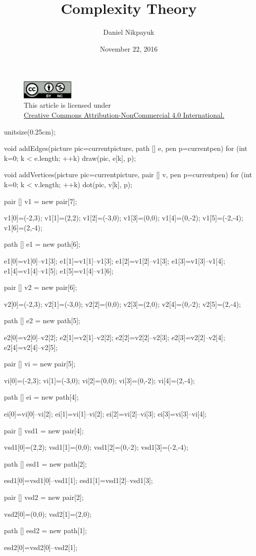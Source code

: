 \documentclass[twoside]{article}
\title{Complexity Theory}
\author{Daniel Nikpayuk}
\date{November 22, 2016}
\begin{document}
\maketitle
\thispagestyle{empty}

\begin{figure}[h]
\centering
\includegraphics[width=1in]{cc-by-nc.png}\\[0.1in]
\tiny This article is licensed under \\
\href{http://creativecommons.org/licenses/by-nc/4.0/}
{Creative Commons Attribution-NonCommercial 4.0 International.}\\[0.3in]
\end{figure}

\begin{asydef}

unitsize(0.25cm);

void addEdges(picture pic=currentpicture, path [] e, pen p=currentpen)
{
	for (int k=0; k < e.length; ++k) draw(pic, e[k], p);
}

void addVertices(picture pic=currentpicture, pair [] v, pen p=currentpen)
{
	for (int k=0; k < v.length; ++k) dot(pic, v[k], p);
}

pair [] v1 = new pair[7];

v1[0]=(-2,3);
v1[1]=(2,2);
v1[2]=(-3,0);
v1[3]=(0,0);
v1[4]=(0,-2);
v1[5]=(-2,-4);
v1[6]=(2,-4);

path [] e1 = new path[6];

e1[0]=v1[0]--v1[3];
e1[1]=v1[1]--v1[3];
e1[2]=v1[2]--v1[3];
e1[3]=v1[3]--v1[4];
e1[4]=v1[4]--v1[5];
e1[5]=v1[4]--v1[6];

pair [] v2 = new pair[6];

v2[0]=(-2,3);
v2[1]=(-3,0);
v2[2]=(0,0);
v2[3]=(2,0);
v2[4]=(0,-2);
v2[5]=(2,-4);

path [] e2 = new path[5];

e2[0]=v2[0]--v2[2];
e2[1]=v2[1]--v2[2];
e2[2]=v2[2]--v2[3];
e2[3]=v2[2]--v2[4];
e2[4]=v2[4]--v2[5];

pair [] vi = new pair[5];

vi[0]=(-2,3);
vi[1]=(-3,0);
vi[2]=(0,0);
vi[3]=(0,-2);
vi[4]=(2,-4);

path [] ei = new path[4];

ei[0]=vi[0]--vi[2];
ei[1]=vi[1]--vi[2];
ei[2]=vi[2]--vi[3];
ei[3]=vi[3]--vi[4];

pair [] vsd1 = new pair[4];

vsd1[0]=(2,2);
vsd1[1]=(0,0);
vsd1[2]=(0,-2);
vsd1[3]=(-2,-4);

path [] esd1 = new path[2];

esd1[0]=vsd1[0]--vsd1[1];
esd1[1]=vsd1[2]--vsd1[3];

pair [] vsd2 = new pair[2];

vsd2[0]=(0,0);
vsd2[1]=(2,0);

path [] esd2 = new path[1];

esd2[0]=vsd2[0]--vsd2[1];

\end{asydef}
\end{document}
